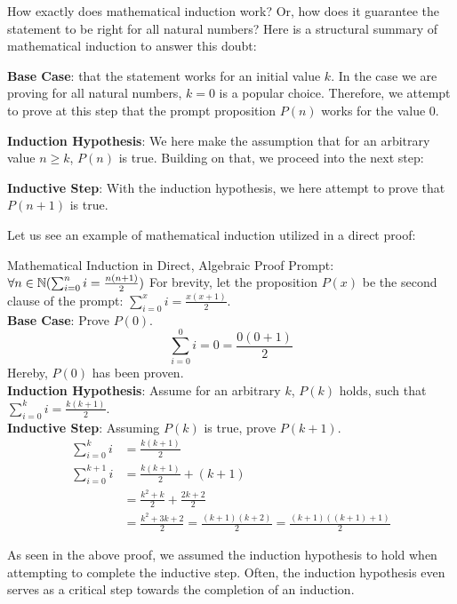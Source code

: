 How exactly does mathematical induction work? Or, how does it guarantee the statement to be right for all natural numbers? Here is a structural summary of mathematical induction to answer this doubt:
\begin{bindenum}
    \item \textbf{Base Case}: that the statement works for an initial value $k$. In the case we are proving for all natural numbers, $k = 0$ is a popular choice. Therefore, we attempt to prove at this step that the prompt proposition $P(n)$ works for the value $0$.
    \item \textbf{Induction Hypothesis}: We here make the assumption that for an arbitrary value $n \geq k$, $P(n)$ is true. Building on that, we proceed into the next step:
    \item \textbf{Inductive Step}: With the induction hypothesis, we here attempt to prove that $P(n + 1)$ is true.
\end{bindenum}

Let us see an example of mathematical induction utilized in a direct proof:
\begin{ln-think}{Mathematical Induction in Direct, Algebraic Proof}{}
    Prompt: $\forall n \in \mathbb{N} (\sum_{i = 0}^{n} {i} = \frac{n(n + 1)}{2})$
    \tcblower
    For brevity, let the proposition $P(x)$ be the second clause of the prompt: $\sum_{i = 0}^{x} {i} = \frac{x(x + 1)}{2}$. \\
    \textbf{Base Case}: Prove $P(0)$.
    \[\sum_{i = 0}^{0} {i} = 0 = \frac{0(0 + 1)}{2}\]
    Hereby, $P(0)$ has been proven. \\
    \textbf{Induction Hypothesis}: Assume for an arbitrary $k$, $P(k)$ holds, such that $\sum_{i = 0}^{k} {i} = \frac{k(k + 1)}{2}$. \\
    \textbf{Inductive Step}: Assuming $P(k)$ is true, prove $P(k + 1)$.
    \begin{align*}
        \sum_{i = 0}^{k} {i} &= \frac{k(k + 1)}{2} \\
        \sum_{i = 0}^{k + 1} {i} &= \frac{k(k + 1)}{2} + (k + 1) \\
        &= \frac{k^2 + k}{2} + \frac{2k + 2}{2} \\
        &= \frac{k^2 + 3k + 2}{2} = \frac{(k + 1)(k + 2)}{2} = \frac{(k + 1)((k + 1) + 1)}{2}
    \end{align*}
\end{ln-think}
As seen in the above proof, we assumed the induction hypothesis to hold when attempting to complete the inductive step. Often, the induction hypothesis even serves as a critical step towards the completion of an induction.

